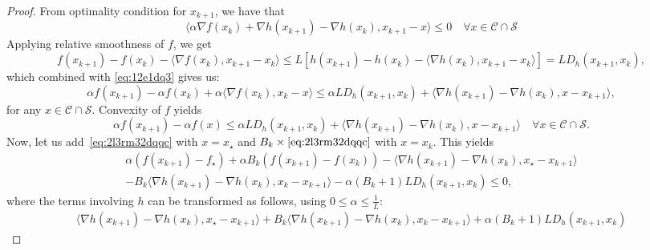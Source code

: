 \documentclass[10pt,a4paper]{amsart}
\newcommand{\CC}{\mathcal{C}}
\newcommand{\ip}[2]{\langle #1, #2\rangle}
\renewcommand{\SS}{\mathcal{S}}
\renewcommand{\leq}{\leqslant}
\begin{document}
\begin{proof}
        From optimality condition for $x_{k+1}$, we have that
        \begin{equation}\label{eq:12e1dq3}
                \ip{\alpha \nabla f(x_{k}) + \nabla h(x_{k+1}) - \nabla h(x_k)}{ x_{k+1}-x}
                \leq
                0
                \quad \forall x\in \CC\cap\SS
        \end{equation}
        Applying relative smoothness of $f$, we get
        \[
                f(x_{k+1}) - f(x_k) - \ip{ \nabla f(x_k)}{ x_{k+1} - x_k}
                \leq
                L \left[ h(x_{k+1}) - h(x_k) - \ip{\nabla h(x_k)}{ x_{k+1}- x_k} \right]
                =
                L D_h(x_{k+1},x_k),
        \]
        which combined with \eqref{eq:12e1dq3} gives us:
        \begin{equation}\label{eq:2l3rm}
                \alpha f(x_{k+1}) - \alpha f(x_k) + \alpha\ip{ \nabla f(x_{k})}{ x_{k}-x}
                \leq
                \alpha L D_h(x_{k+1}, x_k) + \ip{ \nabla h(x_{k+1}) - \nabla h(x_k)}{ x - x_{k+1}},
        \end{equation}  
        for any $x\in  \CC\cap\SS$. Convexity of $f$ yields
        \begin{equation}\label{eq:2l3rm32dqqc}
                \alpha f(x_{k+1}) -  \alpha f(x)
                \leq
                \alpha L D_h(x_{k+1}, x_k) + \ip{ \nabla h(x_{k+1}) - \nabla h(x_k)}{ x - x_{k+1}}
                \quad \forall x\in  \CC\cap\SS.
        \end{equation}  
        Now, let us add~\eqref{eq:2l3rm32dqqc} with $x = x_\star$ and $B_k\times\eqref{eq:2l3rm32dqqc}$ with $x = x_k$.
        This yields
        \begin{multline}\label{eq:dscjom}
                \alpha\left(f(x_{k+1})-f_\star\right) +  \alpha B_k\left(f(x_{k+1})-f(x_k)\right)  - \ip{\nabla h(x_{k+1}) - \nabla h(x_k)}{ x_\star - x_{k+1}}
                \\
                - B_k\ip{\nabla h(x_{k+1}) - \nabla h(x_k)}{ x_k - x_{k+1}} - \alpha(B_k+1)L D_h(x_{k+1},x_k)
                \leq
                0,
        \end{multline}
        where the terms involving $h$ can be transformed as follows, using $0\leq \alpha\leq \tfrac1L$:
        \begin{multline}\label{eq:dscjom_2}
                \ip{\nabla h(x_{k+1}) - \nabla h(x_k)}{ x_\star - x_{k+1}} + B_k\ip{\nabla h(x_{k+1}) - \nabla h(x_k)}{ x_k - x_{k+1}} + \alpha (B_k+1) L D_h(x_{k+1},x_k)

\end{multline}
\end{proof}
\end{document}
